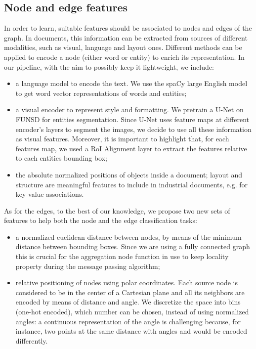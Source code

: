\documentclass[runningheads]{llncs}
\begin{document}
\subsection{Node and edge features}
\label{sec:features}
In order to learn, suitable features should be associated to nodes and edges of the graph. In documents, this information can be extracted from sources of different modalities, such as visual, language and layout ones.
Different methods can be applied to encode a node (either word or entity) to enrich its representation. In our pipeline, with the aim to possibly keep it lightweight, we include:
\begin{itemize}
    \item a language model to encode the text. We use the spaCy large English model to get word vector representations of words and entities;
    \item a visual encoder to represent style and formatting. We pretrain a U-Net\cite{DBLP:journals/corr/RonnebergerFB15} on FUNSD for entities segmentation. Since U-Net uses feature maps at different encoder's layers to segment the images, we decide to use all these information as visual features. Moreover, it is important to highlight that, for each features map, we used a RoI Alignment layer to extract the features relative to each entities bounding box;
    \item the absolute normalized positions of objects inside a document; layout and structure are meaningful features to include in industrial documents, e.g. for key-value associations.
\end{itemize}
As for the edges, to the best of our knowledge, we propose two new sets of features to help both the node and the edge classification tasks:
\begin{itemize}
    \item a normalized euclidean distance between nodes, by means of the minimum distance between bounding boxes. Since we are using a fully connected graph this is crucial for the aggregation node function in use to keep locality property during the message passing algorithm;
    \item relative positioning of nodes using polar coordinates. Each source node is considered to be in the center of a Cartesian plane and all its neighbors are encoded by means of distance and angle. We discretize the space into bins (one-hot encoded), which number can be chosen, instead of using normalized angles: a continuous representation of the angle is challenging because, for instance, two points at the same distance with angles  and  would be encoded differently.
\end{itemize}
\end{document}
